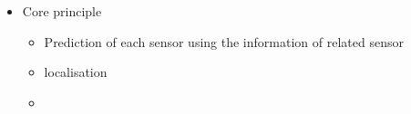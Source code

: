 \documentclass[../description.tex]{subfiles}
\begin{document}
    \begin{itemize}
        \item Core principle 
        \begin{itemize}
            \item Prediction of each sensor using the information of related sensor
            \item localisation 
            \item 
        \end{itemize}
    \end{itemize}
\end{document}
